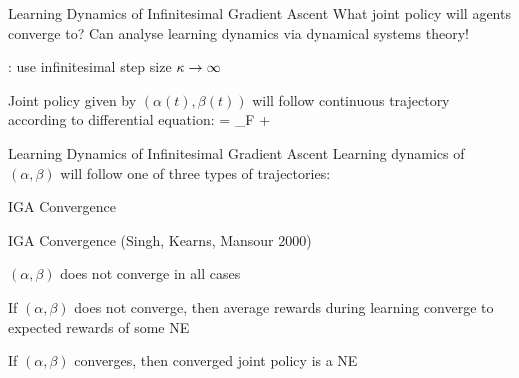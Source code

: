 \begin{frame}{Learning Dynamics of Infinitesimal Gradient Ascent}
    What joint policy will agents converge to?
    \listtab Can analyse learning dynamics via dynamical systems theory!

    \vspace{10pt}
    
    : use infinitesimal step size $\kappa \to \infty$

    Joint policy given by $(\alpha(t),\beta(t))$ will follow continuous trajectory according to differential equation:
    \bmath
	 = _{F}  + 
    \emath
\end{frame}

\begin{frame}[t]{Learning Dynamics of Infinitesimal Gradient Ascent}
    Learning dynamics of $(\alpha,\beta)$ will follow one of three types of trajectories: \\[10pt]
    \begin{figure}
    \hfill
    \hfill
    \end{figure}
\end{frame}

\begin{frame}{IGA Convergence}
    \begin{graytitlebox}{IGA Convergence (Singh, Kearns, Mansour 2000)}
        \blist
            \itemsep=10pt
    	\item<1-> $(\alpha,\beta)$ does not converge in all cases
    	\item<2-> If $(\alpha,\beta)$ does not converge, then average rewards during learning converge to expected rewards of some NE
    	\item<3-> If $(\alpha,\beta)$ converges, then converged joint policy is a NE
        \elist
    \end{graytitlebox}
\end{frame}

